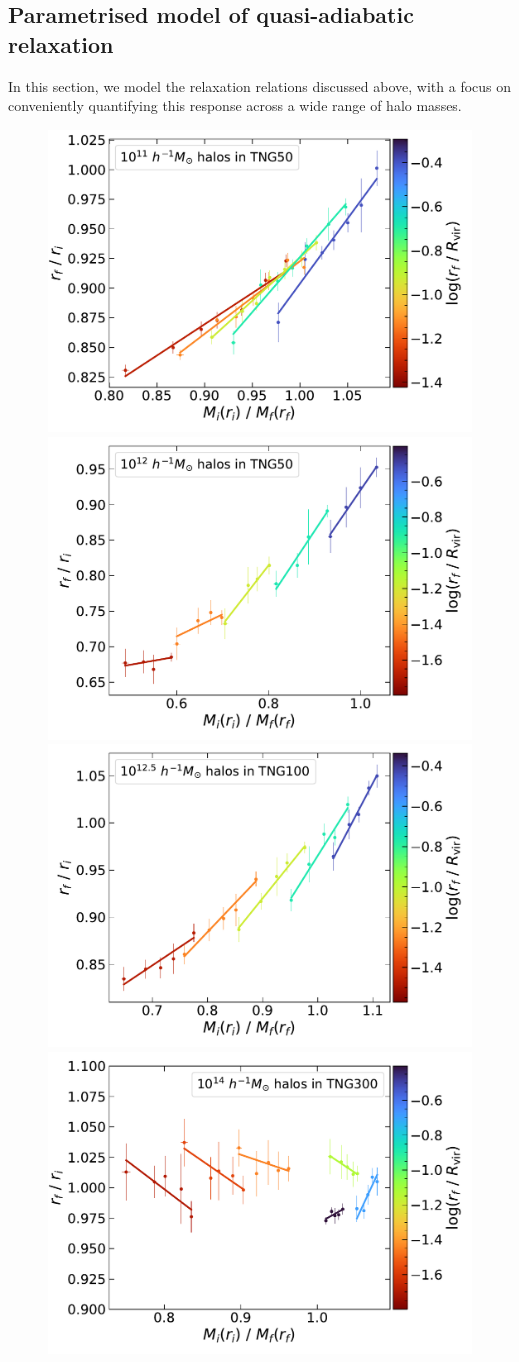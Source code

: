 \subsection{Parametrised model of quasi-adiabatic relaxation}
\label{sec:results-rad-dep-qadiab-ch:z0main}
In this section, we model the relaxation relations discussed above, with a focus on conveniently quantifying this response across a wide range of halo masses.

\begin{figure}
    \centering
    \includegraphics[width=0.48\linewidth]{plots/fit_show_rf_M_T50_M11.pdf}
    \includegraphics[width=0.48\linewidth]{plots/fit_show_rf_M_T50_M12.pdf}
    \includegraphics[width=0.48\linewidth]{plots/fit_show_rf_M_T100_M12.5.pdf}
    \includegraphics[width=0.48\linewidth]{plots/fit_show_rf_M_T300_M14.pdf}

\end{figure}
